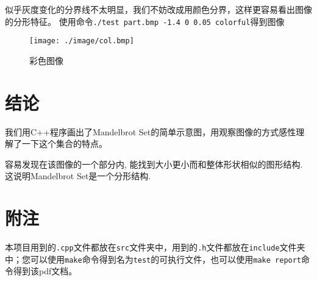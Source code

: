 \documentclass{article}
\begin{document}
似乎灰度变化的分界线不太明显，我们不妨改成用颜色分界，这样更容易看出图像的分形特征。
使用命令\verb|./test part.bmp -1.4 0 0.05 colorful|得到图像
\begin{figure}[H]
     \centering
     \texttt{[image: ./image/col.bmp]}
     \caption{彩色图像}
\end{figure}
\section{结论}
     我们用C++程序画出了Mandelbrot Set的简单示意图，用观察图像的方式感性理解了一下这个集合的特点。

     容易发现在该图像的一个部分内, 能找到大小更小而和整体形状相似的图形结构. 这说明Mandelbrot Set是一个分形结构.
\section{附注}
     本项目用到的\verb|.cpp|文件都放在\verb|src|文件夹中，用到的\verb|.h|文件都放在\verb|include|文件夹中；您可以使用\verb|make|命令得到名为\verb|test|的可执行文件，也可以使用\verb|make report|命令得到该pdf文档。

\end{document}
